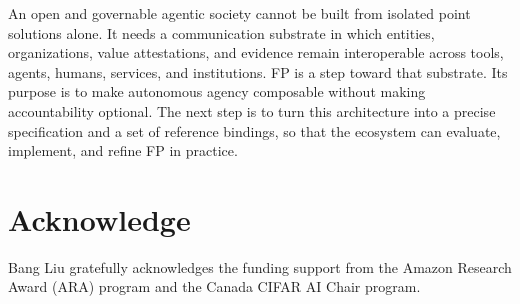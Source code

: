 \documentclass{foundationpaper}
\begin{document}
An open and governable agentic society cannot be built from isolated point solutions alone. It needs a communication substrate in which entities, organizations, value attestations, and evidence remain interoperable across tools, agents, humans, services, and institutions. FP is a step toward that substrate. Its purpose is to make autonomous agency composable without making accountability optional. The next step is to turn this architecture into a precise specification and a set of reference bindings, so that the ecosystem can evaluate, implement, and refine FP in practice.

\section*{Acknowledge}
\label{sec:ack}
Bang Liu gratefully acknowledges the funding support from the Amazon Research Award (ARA) program and the Canada CIFAR AI Chair program.






\end{document}
